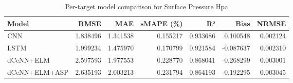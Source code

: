 \begin{table}
\caption{Per-target model comparison for Surface Pressure Hpa}
\begin{tabular}{lrrrrrr}
\toprule
Model & RMSE & MAE & sMAPE (\%) & R² & Bias & NRMSE \\
\midrule
CNN & 1.838496 & 1.341538 & 0.155217 & 0.933686 & 0.100548 & 0.002124 \\
LSTM & 1.999234 & 1.475970 & 0.170799 & 0.921584 & -0.087637 & 0.002310 \\
dCeNN+ELM & 2.597593 & 1.977553 & 0.228770 & 0.868041 & -0.268299 & 0.003001 \\
dCeNN+ELM+ASP & 2.635193 & 2.003213 & 0.231794 & 0.864193 & -0.192295 & 0.003045 \\
\bottomrule
\end{tabular}
\end{table}
